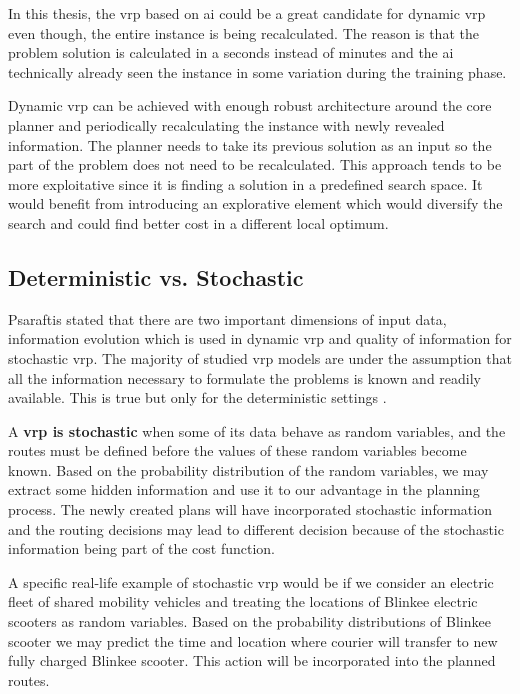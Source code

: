     In this thesis, the \gls{vrp} based on \gls{ai} could be a great candidate for dynamic \gls{vrp} even though, the entire instance is being recalculated. The reason is that the problem solution is calculated in a seconds instead of minutes and the \gls{ai} technically already seen the instance in some variation during the training phase.
    
    Dynamic \gls{vrp} can be achieved with enough robust architecture around the core planner and periodically recalculating the instance with newly revealed information. The planner needs to take its previous solution as an input so the part of the problem does not need to be recalculated. This approach tends to be more exploitative since it is finding a solution in a predefined search space. It would benefit from introducing an explorative element which would diversify the search and could find better cost in a different local optimum.

    \subsection{Deterministic vs. Stochastic}\label{dynamic}
    Psaraftis \cite{psaraftis} stated that there are two important dimensions of input data, information evolution which is used in dynamic \gls{vrp} and quality of information for stochastic \gls{vrp}. The majority of studied \gls{vrp} models are under the assumption that all the information necessary to formulate the problems is known and readily available. This is true but only for the deterministic settings \cite{vrp-bible}.
    
    A \textbf{\gls{vrp} is stochastic} \cite{stochastic-vrp} when some of its data behave as random variables, and the routes must be defined before the values of these random variables become known. Based on the probability distribution of the random variables, we may extract some hidden information and use it to our advantage in the planning process. The newly created plans will have incorporated stochastic information and the routing decisions may lead to different decision because of the stochastic information being part of the cost function.
    
    A specific real-life example of stochastic \gls{vrp} would be if we consider an electric fleet of shared mobility vehicles and treating the locations of Blinkee electric scooters as random variables. Based on the probability distributions of Blinkee scooter we may predict the time and location where courier will transfer to new fully charged Blinkee scooter. This action will be incorporated into the planned routes.
    
